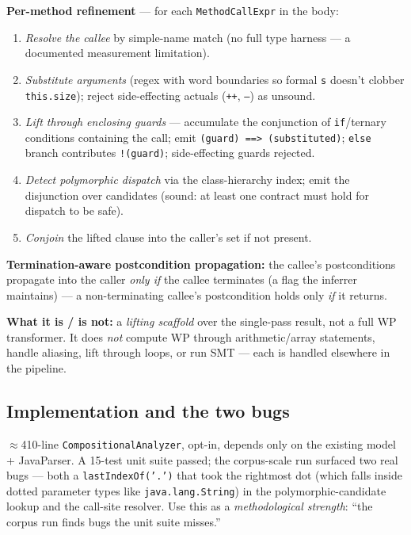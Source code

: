\documentclass[11pt]{article}
\begin{document}
\textbf{Per-method refinement} --- for each \texttt{MethodCallExpr} in the
body:
\begin{enumerate}[leftmargin=1.6em,itemsep=0.05em]
  \item \emph{Resolve the callee} by simple-name match (no full type harness ---
        a documented measurement limitation).
  \item \emph{Substitute arguments} (regex with word boundaries so formal
        \texttt{s} doesn't clobber \texttt{this.size}); reject side-effecting
        actuals (\texttt{++}, \texttt{--}) as unsound.
  \item \emph{Lift through enclosing guards} --- accumulate the conjunction of
        \texttt{if}/ternary conditions containing the call; emit
        \texttt{(guard) ==> (substituted)}; \texttt{else} branch contributes
        \texttt{!(guard)}; side-effecting guards rejected.
  \item \emph{Detect polymorphic dispatch} via the class-hierarchy index; emit
        the disjunction over candidates (sound: at least one contract must
        hold for dispatch to be safe).
  \item \emph{Conjoin} the lifted clause into the caller's set if not present.
\end{enumerate}
\textbf{Termination-aware postcondition propagation:} the callee's
postconditions propagate into the caller \emph{only if} the callee terminates
(a flag the inferrer maintains) --- a non-terminating callee's postcondition
holds only \emph{if} it returns.

\textbf{What it is / is not:} a \emph{lifting scaffold} over the single-pass
result, not a full WP transformer. It does \emph{not} compute WP through
arithmetic/array statements, handle aliasing, lift through loops, or run SMT ---
each is handled elsewhere in the pipeline.

\subsection{Implementation and the two bugs}

$\approx$410-line \texttt{CompositionalAnalyzer}, opt-in, depends only on the
existing model + JavaParser. A 15-test unit suite passed; the corpus-scale run
surfaced two real bugs --- both a \texttt{lastIndexOf('.')} that took the
rightmost dot (which falls inside dotted parameter types like
\texttt{java.lang.String}) in the polymorphic-candidate lookup and the
call-site resolver. Use this as a \emph{methodological strength}: ``the corpus
run finds bugs the unit suite misses.''
\end{document}
